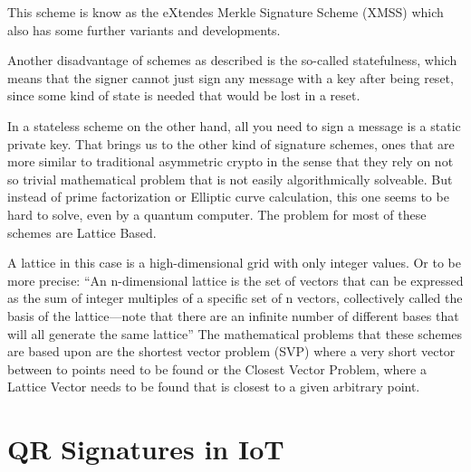 \documentclass[conference]{IEEEtran}
\newcommand{\comment}[1]{}
\begin{document}
This scheme is know as the eXtendes Merkle Signature Scheme (XMSS) which also has some further variants and developments. \cite{QR_IoT }

Another disadvantage of schemes as described is the so-called statefulness, which means that the signer cannot just sign any message with a key after being reset, since some kind of state is needed that would be lost in a reset. \cite{QR_sigs}

In a stateless scheme on the other hand, all you need to sign a message is a static private key.
That brings us to the other kind of signature schemes, ones that are more similar to traditional asymmetric crypto in the sense that they rely on not so trivial mathematical problem that is not easily algorithmically solveable. But instead of prime factorization or Elliptic curve calculation, this one seems to be hard to solve, even by a quantum computer. The problem for most of these schemes are Lattice Based.

A lattice in this case is a high-dimensional grid with only integer values. Or to be more precise: ``An n-dimensional lattice is the set of vectors that can be
expressed as the sum of integer multiples of a specific set of n
vectors, collectively called the basis of the lattice—note that
there are an infinite number of different bases that will all
generate the same lattice'' \cite{QR_algs}
The mathematical problems that these schemes are based upon are the shortest vector problem (SVP) where a very short vector between to points need to be found or the Closest Vector Problem, where a Lattice Vector needs to be found that is closest to a given arbitrary point.



\section{QR Signatures in IoT}
\comment{ %
Stack usage:
    name            & KeyGen    & Sign  & Verify
    Dilithium-3     & 50k       & 86k   & 54k
    newer dil(dyn)  & not meas  & 52k   & 36k \cite{update_sign}
    newer dil(sta)  & aheadOf t & 35k   & 19k \cite{update_sign}
    qTESLA-1        & 22k       & 29k   & 23k
    qTESLA-3        & 43k       & 28k   & 45k
    Falcon-5        & 120k      & 120k  & 120k
    newer FALCON    & not meas  & 42k   & 4.7k \cite{update_sign}

Clock cycles (10mil ~ 60ms (ARM M4 (168Mhz))):
    name        & KeyGen    & Sign  & Verify
    Dilithium-3 & 2.3m      & 8.3m  & 2.3m
    Dilithium-3 & 2.1       & 7.2   & 2.1 \cite{Energy_comp}
    Falcon-5    & 365m      & 165m  & 1m
    Falcon      & note meas & 75m   & 1m \cite{update_sign}
    qTESLA-3    & 30m       & 11m   & 2.2m
    \cite{QR_Iot_Lattice}

Hash-Based Sphincs promising since stateless, but many parameters to set \cite{QR_IoT_Energy}

as of \cite{QR_comparison} only schemes (out of ~50) with < 4kbit: SIKE and Round5 
} %
\end{document}
